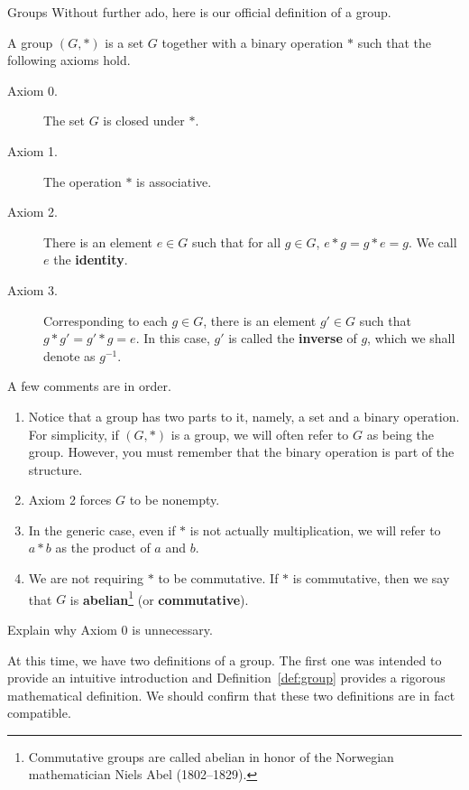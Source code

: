 \begin{section}{Groups}
Without further ado, here is our official definition of a group.

\begin{definition}\label{def:group}
A group $(G,*)$ is a set $G$ together with a binary operation $*$ such that the following axioms hold.
\begin{description}
\item[Axiom 0.] The set $G$ is closed under $*$.
\item[Axiom 1.] The operation $*$ is associative.
\item[Axiom 2.] There is an element $e\in G$ such that for all $g\in G$, $e*g=g*e=g$.  We call $e$ the \textbf{identity}.
\item[Axiom 3.] Corresponding to each $g\in G$, there is an element $g'\in G$ such that $g*g'=g'*g=e$.  In this case, $g'$ is called the \textbf{inverse} of $g$, which we shall denote as $g^{-1}$.
\end{description}
\end{definition}

\begin{remark}
A few comments are in order.
\begin{enumerate}
\item Notice that a group has two parts to it, namely, a set and a binary operation.  For simplicity, if $(G,*)$ is a group, we will often refer to $G$ as being the group.  However, you must remember that the binary operation is part of the structure.
\item Axiom 2 forces $G$ to be nonempty.
\item In the generic case, even if $*$ is not actually multiplication, we will refer to $a*b$ as the product of $a$ and $b$.
\item We are not requiring $*$ to be commutative.  If $*$ is commutative, then we say that $G$ is \textbf{abelian}\footnote{Commutative groups are called abelian in honor of the Norwegian mathematician Niels Abel (1802--1829).} (or \textbf{commutative}).
\end{enumerate}
\end{remark}

\begin{exercise}
Explain why Axiom 0 is unnecessary.
\end{exercise}

At this time, we have two definitions of a group.  The first one was intended to provide an intuitive introduction and Definition~\ref{def:group} provides a rigorous mathematical definition.  We should confirm that these two definitions are in fact compatible.


\end{section}
